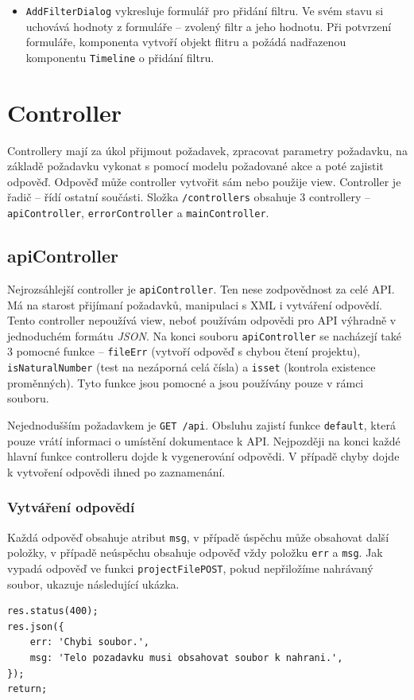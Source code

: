 \begin{itemize}
\item \texttt{AddFilterDialog} vykresluje formulář pro přidání filtru. Ve svém stavu si uchovává hodnoty z formuláře -- zvolený filtr a jeho hodnotu. Při potvrzení formuláře, komponenta vytvoří objekt flitru a požádá nadřazenou komponentu \texttt{Timeline} o přidání filtru.
\end{itemize}

\section{Controller}
Controllery mají za úkol přijmout požadavek, zpracovat parametry požadavku, na základě požadavku vykonat s pomocí modelu požadované akce a poté zajistit odpověď. Odpověď může controller vytvořit sám nebo použije view. Controller je řadič -- řídí ostatní součásti. Složka \texttt{/controllers} obsahuje 3 controllery -- \texttt{apiController}, \texttt{errorController} a \texttt{mainController}.

\subsection{apiController}
Nejrozsáhlejší controller je \texttt{apiController}. Ten nese zodpovědnost za celé API. Má na starost přijímaní požadavků, manipulaci s XML i vytváření odpovědí. Tento controller nepoužívá view, neboť používám odpovědi pro API výhradně v jednoduchém formátu \textit{JSON}. Na konci souboru \texttt{apiController} se nacházejí také 3 pomocné funkce -- \texttt{fileErr} (vytvoří odpověď s chybou čtení projektu), \texttt{isNaturalNumber} (test na nezáporná celá čísla) a \texttt{isset} (kontrola existence proměnných). Tyto funkce jsou pomocné a jsou používány pouze v rámci souboru.

Nejednodušším požadavkem je \texttt{GET /api}. Obsluhu zajistí funkce \texttt{default}, která pouze vrátí informaci o umístění dokumentace k API. Nejpozději na konci každé hlavní funkce controlleru dojde k vygenerování odpovědi. V případě chyby dojde k vytvoření odpovědi ihned po zaznamenání.

\subsubsection{Vytváření odpovědí}
Každá odpověď obsahuje atribut \texttt{msg}, v případě úspěchu může obsahovat další položky, v případě neúspěchu obsahuje odpověď vždy položku \texttt{err} a \texttt{msg}. Jak vypadá odpověď ve funkci \texttt{projectFilePOST}, pokud nepřiložíme nahrávaný soubor, ukazuje následující ukázka.
\begin{lstlisting}[style=JavaScript]
res.status(400);
res.json({
    err: 'Chybi soubor.',
    msg: 'Telo pozadavku musi obsahovat soubor k nahrani.',
});
return;
\end{lstlisting}

